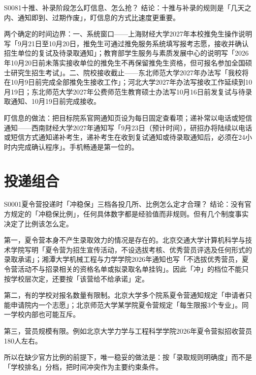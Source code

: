 \begin{qa}{S0081}{十推、补录阶段怎么盯信息、怎么抢？}
结论：十推与补录的规则是「几天之内、通知即到、过期作废」，盯信息的方式比速度更重要。

两个确定的时间边界：一、系统窗口——上海财经大学2027年本校推免生操作说明写「9月21日至10月20日，推免生可通过推免服务系统填写报考志愿，接收并确认招生单位的复试及待录取通知」；教育部学生服务与素质发展中心的说明写「2026年10月20日前未落实接收单位的推免生不再保留推免生资格，但可报名参加全国硕士研究生招生考试」。二、院校接收截止——东北师范大学2027年办法写「我校将在10月9日前完成全部推免生接收工作」；河北大学2027年办法写接收工作延续到10月19日；东北师范大学2027年公费师范生教育硕士办法写10月16日前发复试与待录取通知、10月19日前完成接收。

盯信息的做法：把目标院系官网通知页设为每日固定查看项；递补常以电话或短信通知——西南财经大学2027年通知写「9月23日（预计时间），研招办将陆续以电话或短信方式通知递补考生，递补考生在收到复试通知或待录取通知后，必须在24小时内完成确认程序」。手机畅通是第一位的。
\end{qa}

\section{投递组合}
\begin{qa}{S0001}{夏令营投递时「冲稳保」三档各投几所、比例怎么定才合理？}
结论：没有官方规定的「冲稳保比例」，任何具体数字都是经验值而非规则。但有几个制度事实决定了比例该怎么定。

第一，夏令营本身不产生录取效力的情况是存在的。北京交通大学计算机科学与技术学院写明「夏令营为招生宣传活动，不设选拔考核、优秀营员评选及任何形式的录取承诺」；湘潭大学机械工程与力学学院2026年通知也写「不选拔优秀营员，夏令营活动不与招录相关的资格名单或拟录取名单挂钩」。因此「冲」的档位不能只按学校层次定，还要按「该营给不给承诺」定。

第二，有的学校对报名数量有限制。北京大学多个院系夏令营通知规定「申请者只能申请院内一个志愿」；北京师范大学某学院夏令营规定「每生限报3个专业」。同一学校内部也可能互斥。

第三，营员规模有限。例如北京大学力学与工程科学学院2026年夏令营拟招收营员180人左右。

所以在缺少官方比例的前提下，唯一稳妥的做法是：按「录取规则明确度」而不是「学校排名」分档，把时间冲突作为主要约束条件。
\end{qa}

